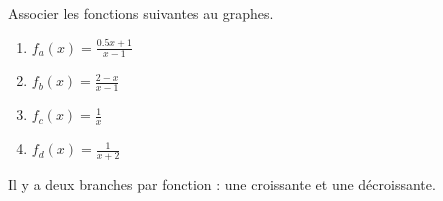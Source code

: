 
\begin{exercice}\label{exosmath-0334}

    Associer les fonctions suivantes au graphes.

\begin{center}
   
\end{center}

\let\Oldtheenumi\theenumi
\renewcommand{\theenumi}{(\alph{enumi})}
\begin{multicols}{2}
    \begin{enumerate}
        \item
            \( f_a(x)=\frac{ 0.5x+1 }{ x-1 }\)
        \item
            \( f_b(x)=\frac{2-x}{ x-1 }\)
        \item
            \( f_c(x)=\frac{ 1 }{ x }\)
        \item
            \( f_d(x)=\frac{1}{ x+2 }\)
    \end{enumerate}
\end{multicols}
\let\theenumi\Oldtheenumi
Il y a deux branches par fonction : une croissante et une décroissante.

\end{exercice}
